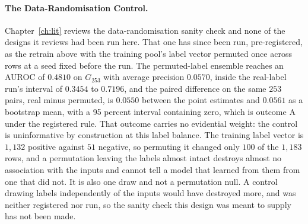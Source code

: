 \paragraph{The Data-Randomisation Control.} Chapter~\ref{ch:lit} reviews the
data-randomisation sanity check and none of the designs it reviews had been run
here. That one has since been run, pre-registered, as the retrain above with the
training pool's label vector permuted once across rows at a seed fixed before the
run. The permuted-label ensemble reaches an AUROC of $0.4810$ on $G_{253}$ with
average precision $0.0570$, inside the real-label run's interval of $0.3454$ to
$0.7196$, and the paired difference on the same $253$ pairs, real minus permuted, is $0.0550$ between
the point estimates and $0.0561$ as a bootstrap mean, with a 95 percent interval containing
zero, which is outcome A under the
registered rule. That outcome carries no evidential weight: the control is
uninformative by construction at this label balance. The training label vector is
$1{,}132$ positive against $51$ negative, so permuting it changed only $100$ of
the $1{,}183$ rows, and a permutation leaving the labels almost intact destroys
almost no association with the inputs and cannot tell a model that learned from
them from one that did not. It is also one draw and not a permutation null. A
control drawing labels independently of the inputs would have destroyed more, and
was neither registered nor run, so the sanity check this design was meant to
supply has not been made.

